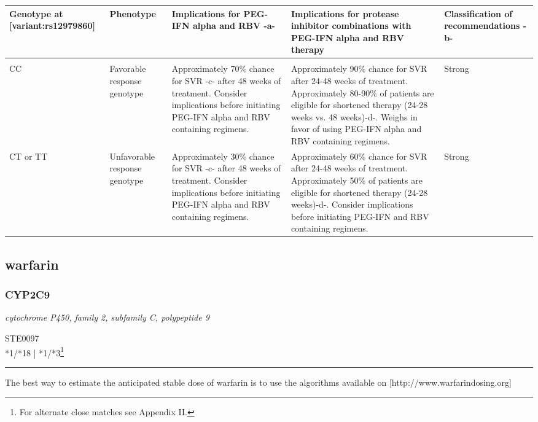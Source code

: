 \documentclass{report}
\begin{document}
      \begin{tabularx}{\textwidth}{ XXXXX }
      \textbf{ Genotype at [variant:rs12979860] }&\textbf{ Phenotype }&\textbf{ Implications for PEG-IFN alpha and RBV -a- }&\textbf{ Implications for protease inhibitor combinations with PEG-IFN alpha and RBV therapy }&\textbf{ Classification of recommendations -b- } \\ \hline \\  CC & Favorable response genotype & Approximately 70\% chance for SVR -c- after 48 weeks of treatment. Consider implications before initiating PEG-IFN alpha and RBV containing regimens. & Approximately 90\% chance for SVR after 24-48 weeks of treatment. Approximately 80-90\% of patients are eligible for shortened therapy (24-28 weeks vs. 48 weeks)-d-. Weighs in favor of using PEG-IFN alpha and RBV containing regimens.& Strong  \\  CT or TT & Unfavorable response genotype & Approximately 30\% chance for SVR -c- after 48 weeks of treatment. Consider implications before initiating PEG-IFN alpha and RBV containing regimens. & Approximately 60\% chance for SVR after 24-48 weeks of treatment. Approximately 50\% of patients are eligible for shortened therapy (24-28 weeks)-d-. Consider implications before initiating PEG-IFN and RBV containing regimens.& Strong  \\ 
      \end{tabularx}
      
      \normalsize





















\subsection{ warfarin }

\subsubsection{ CYP2C9 }
     \textit{ cytochrome P450, family 2, subfamily C, polypeptide 9 } \begin{flushright} \textsc{ STE0097 \\ *1/*18  | *1/*3\footnote{For alternate close matches see Appendix II.} }\end{flushright}
      \hrule \vspace{6pt}
      The best way to estimate the anticipated stable dose of warfarin is to use the algorithms available on [http://www.warfarindosing.org] \newline
      \scriptsize
      
\end{document}
